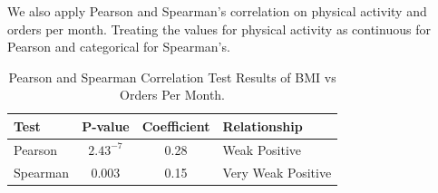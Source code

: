\documentclass[a4paper,fleqn]{cas-sc}
\begin{document}
We also apply Pearson and Spearman's correlation on physical activity and orders per month. Treating the values for physical activity as continuous for Pearson and categorical for Spearman's.

\begin{table}[htb]
    \caption{Pearson and Spearman Correlation Test Results of BMI vs Orders Per Month.}
    \label{tab:pearson_spearman_bmi_OPM}
    \begin{tabular*}{\linewidth}{@{\extracolsep{\fill}}lccl@{}}
        \toprule
        Test & P-value & Coefficient & Relationship \\
        \midrule
        Pearson & $2.43^{-7}$ & 0.28 & Weak Positive \\
        Spearman & 0.003 & 0.15 & Very Weak Positive \\
        \bottomrule
    \end{tabular*}
\end{table}




\end{document}
